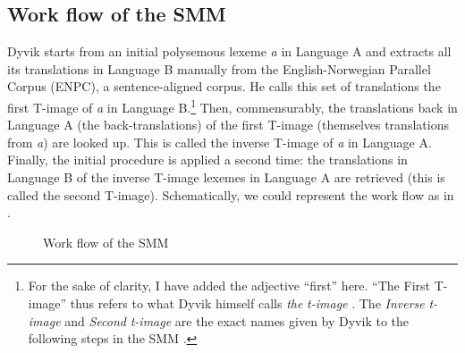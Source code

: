 \subsection{Work flow of the SMM}
\label{sec:3.4.1}
Dyvik \citep{johansson_translational_1998} starts from an initial polysemous lexeme \textit{a} in Language A and extracts all its translations in Language B manually from the English-Norwegian Parallel Corpus (ENPC), a sentence-aligned corpus. He calls this set of translations the first T-image of \textit{a} in Language B.\footnote{For the sake of clarity, I have added the adjective “first” here. “The First T-image” thus refers to what Dyvik himself calls \textit{the} \textit{t-image} \citep{johansson_translational_1998}. The \textit{Inverse} \textit{t-image} and \textit{Second} \textit{t-image} are the exact names given by Dyvik to the following steps in the SMM \citep{johansson_translational_1998}.} Then, commensurably, the translations back in Language A (the back-translations) of the first T-image (themselves translations from \textit{a}) are looked up. This is called the inverse T-image of \textit{a} in Language A. Finally, the initial procedure is applied a second time: the translations in Language B of the inverse T-image lexemes in Language A are retrieved (this is called the second T-image). Schematically, we could represent the work flow as in .

\begin{figure}
\caption{\label{fig:3:8}Work flow of the SMM}
\end{figure}

